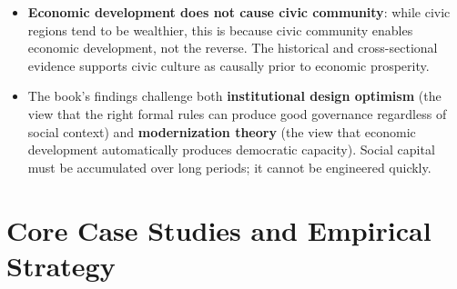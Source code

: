 \documentclass[12pt]{article}
\begin{document}
\begin{itemize}[leftmargin=*, itemsep=4pt]
    \item \textbf{Economic development does not cause civic community}: while civic regions tend to be wealthier, this is because civic community enables economic development, not the reverse. The historical and cross-sectional evidence supports civic culture as causally prior to economic prosperity.
    \item The book's findings challenge both \textbf{institutional design optimism} (the view that the right formal rules can produce good governance regardless of social context) and \textbf{modernization theory} (the view that economic development automatically produces democratic capacity). Social capital must be accumulated over long periods; it cannot be engineered quickly.
\end{itemize}

\section{Core Case Studies and Empirical Strategy}
\end{document}
